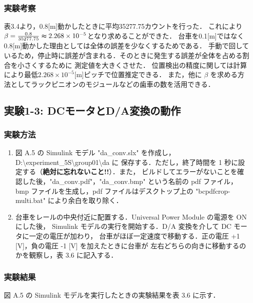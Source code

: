 \subsubsection{実験考察}
表3.4より，0.8[m]動かしたときに平均35277.75カウントを行った．
これにより\( \beta =  \frac{0.8}{35277.75}\thickapprox 2.268\times 10^{-5}\)となり求めることができた．
台車を0.1[m]ではなく0.8[m]動かした理由としては全体の誤差を少なくするためである．
手動で回しているため，停止時に誤差が含まれる．そのときに発生する誤差が全体を占める割合を小さくするために
測定値を大きくさせた．
位置検出の精度に関しては計算により最低\(2.268\times 10^{-5}\)[m]ピッチで位置推定できる．
また，他に \(\beta\) を求める方法としてラックピニオンのモジュールなどの歯車の数を活用できる．

\subsection{実験1-3: DCモータとD/A変換の動作}

\subsubsection{実験方法}
\begin{enumerate}
  \item 図 A.5 の Simulink モデル "da\_conv.slx" を作成し，
        D:\textbackslash experiment\_5S\textbackslash group01\textbackslash da に
        保存する．ただし，終了時間を 1 秒に設定する（\textbf{絶対に忘れないこと!!}）．また，
        ビルドしてエラーがないことを確認した後，"da\_conv.pdf"，"da\_conv.bmp" という名前の
        pdf ファイル，bmp ファイルを生成し，pdf ファイルはデスクトップ上の 
        "bcpdfcrop-multi.bat" により余白を取り除く．
        
  \item 台車をレールの中央付近に配置する．Universal Power Module の電源を ON にした後，
        Simulink モデルの実行を開始する．D/A 変換を介して DC モータに一定の電圧が加わり，
        台車がほぼ一定速度で移動する．正の電圧 +1 [V]，負の電圧 -1 [V] を加えたときに台車が
        左右どちらの向きに移動するのかを観察し，表 3.6 に記入する．
        
\end{enumerate}

\subsubsection{実験結果}
図 A.5 の Simulink モデルを実行したときの実験結果を表 3.6 に示す．

